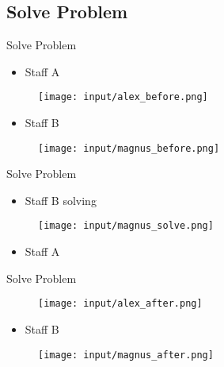 \subsection{Solve Problem}
\begin{frame}{Solve Problem}
\begin{itemize}
	\item Staff A
\end{itemize}

\begin{figure}[H]
	\centering
		\texttt{[image: input/alex\_before.png]}
	\label{fig:alex_before}
\end{figure}

\begin{itemize}
	\item Staff B
\end{itemize}

\begin{figure}[H]
	\centering
		\texttt{[image: input/magnus\_before.png]}
	\label{fig:magnus_before}
\end{figure}
\end{frame}

\begin{frame}{Solve Problem}
\begin{itemize}
	\item Staff B solving
\end{itemize}
\begin{figure}[H]
	\centering
		\texttt{[image: input/magnus\_solve.png]}
	\label{fig:magnus_solve}
\end{figure}
\end{frame}

\begin{itemize}
	\item Staff A
\end{itemize}

\begin{frame}{Solve Problem}
\begin{figure}[H]
	\centering
		\texttt{[image: input/alex\_after.png]}
	\label{fig:alex_after}
\end{figure}

\begin{itemize}
	\item Staff B
\end{itemize}

\begin{figure}[H]
	\centering
		\texttt{[image: input/magnus\_after.png]}
	\label{fig:magnus_after}
\end{figure}
\end{frame}

